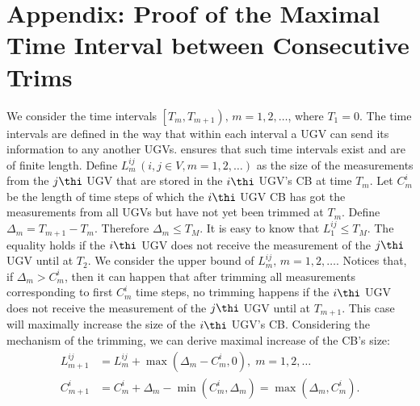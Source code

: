 \appendix
	\section*{Appendix: Proof of the Maximal Time Interval between Consecutive Trims}
	
	We consider the time intervals $\left[T_m,T_{m+1} \right),\,m=1,2,\dots$, where $T_1=0$.
	The time intervals are defined in the way that within each interval a UGV can send its information to any another UGVs.
	 ensures that such time intervals exist and are of finite length.
	Define $L^{ij}_m\,(i,j\in V, m=1,2,\dots)$ as the size of the measurements from the $j\thi$ UGV that are stored in the $i\thi$ UGV's CB at time $T_m$.
	Let $C^i_m$ be the length of time steps of which the $i\thi$ UGV CB has got the measurements from all UGVs but have not yet been trimmed at $T_m$.
	Define $\Delta_m = T_{m+1}-T_m$. 
	Therefore $\Delta_m \le T_M$.
	It is easy to know that $L^{ij}_1\le T_M$. 
	The equality holds if the $i\thi$ UGV does not receive the measurement of the $j\thi$ UGV until at $T_2$.
	We consider the upper bound of $L^{ij}_m,\,m=1,2,\dots$.
	Notices that, if $\Delta_m>C^i_m$, then it can happen that after trimming all measurements corresponding to first $C^i_m$ time steps, no trimming happens if the $i\thi$ UGV does not receive the measurement of the $j\thi$ UGV until at $T_{m+1}$.
	This case will maximally increase the size of the $i\thi$ UGV's CB.
	Considering the mechanism of the trimming, we can derive maximal increase of the CB's size:
	\begin{align*}
	L^{ij}_{m+1} &= L^{ij}_{m}+\max(\Delta_{m}-C^i_{m},0),\;m=1,2,\dots\\
	C^i_{m+1}&=C^i_m+\Delta_m-\min(C^i_m,\Delta_m)=\max(\Delta_m,C^i_m).
	\end{align*}
	
